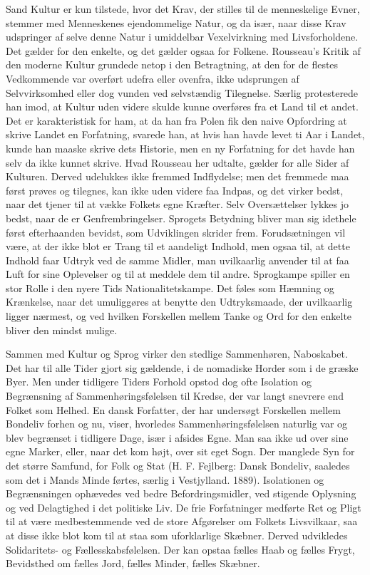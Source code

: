 \documentclass[12pt,a4paper,openany]{book}
\newcommand{\opage}[1]{\marginnote{\footnotesize\textit{[#1]}}}
\begin{document}
Sand Kultur er kun tilstede, hvor det Krav, der stilles til de menneskelige
Evner, stemmer med Menneskenes ejendommelige Natur,
og da især, naar disse Krav udspringer af selve denne Natur i umiddelbar
Vexelvirkning med Livsforholdene. Det gælder for den enkelte,
og det gælder ogsaa for Folkene. Rousseau’s Kritik af den moderne
Kultur grundede netop i den Betragtning, at den for de flestes
Vedkommende var overført udefra eller ovenfra, ikke udsprungen
af Selvvirksomhed eller dog vunden ved selvstændig Tilegnelse. Særlig
protesterede han imod, at Kultur uden videre skulde kunne overføres
fra et Land til et andet. Det er karakteristisk for ham, at da
han fra Polen fik den naive Opfordring at skrive Landet en Forfatning,
svarede han, at hvis han havde levet ti Aar i Landet, kunde
han maaske skrive dets Historie, men en ny Forfatning for det
havde han selv da ikke kunnet skrive. Hvad Rousseau her udtalte,
gælder for alle Sider af Kulturen. Derved udelukkes ikke fremmed
Indflydelse; men det fremmede maa først prøves og tilegnes, kan
ikke uden videre faa Indpas, og det virker bedst, naar det tjener til
at vække Folkets egne Kræfter. Selv Oversættelser lykkes jo bedst,
naar de er Genfrembringelser. Sprogets Betydning bliver man sig
idethele først efterhaanden bevidst, som Udviklingen skrider frem.
Forudsætningen vil være, at der ikke blot er Trang til et aandeligt
Indhold, men ogsaa til, at dette Indhold faar Udtryk ved de samme
Midler, man uvilkaarlig anvender til at faa Luft for sine Oplevelser
og til at meddele dem til andre. Sprogkampe spiller en stor Rolle i
den nyere Tids Nationalitetskampe. Det føles som Hæmning og
Krænkelse, naar det umuliggøres at benytte den Udtryksmaade, der
uvilkaarlig ligger nærmest, og ved hvilken Forskellen mellem Tanke
og Ord for den enkelte bliver den mindst mulige.

Sammen med Kultur og Sprog virker den stedlige Sammenhøren,
Naboskabet. Det har til alle Tider gjort sig gældende, i de nomadiske
Horder som i de græske Byer. Men under tidligere Tiders Forhold
opstod dog ofte Isolation og Begrænsning af Sammenhøringsfølelsen
til Kredse, der var langt snevrere end Folket som Helhed.
\opage{103}En dansk Forfatter, der har undersøgt Forskellen mellem Bondeliv
forhen og nu, viser, hvorledes Sammenhøringsfølelsen naturlig var
og blev begrænset i tidligere Dage, især i afsides Egne. Man saa
ikke ud over sine egne Marker, eller, naar det kom højt, over sit
eget Sogn. Der manglede Syn for det større Samfund, for Folk og
Stat (H. F. Fejlberg: Dansk Bondeliv, saaledes som det i Mands
Minde førtes, særlig i Vestjylland. 1889). Isolationen og Begrænsningen
ophævedes ved bedre Befordringsmidler, ved stigende Oplysning
og ved Delagtighed i det politiske Liv. De frie Forfatninger
medførte Ret og Pligt til at være medbestemmende ved de store Afgørelser
om Folkets Livsvilkaar, saa at disse ikke blot kom til at
staa som uforklarlige Skæbner. Derved udvikledes Solidaritets- og
Fællesskabsfølelsen. Der kan opstaa fælles Haab og fælles Frygt,
Bevidsthed om fælles Jord, fælles Minder, fælles Skæbner.
\end{document}
